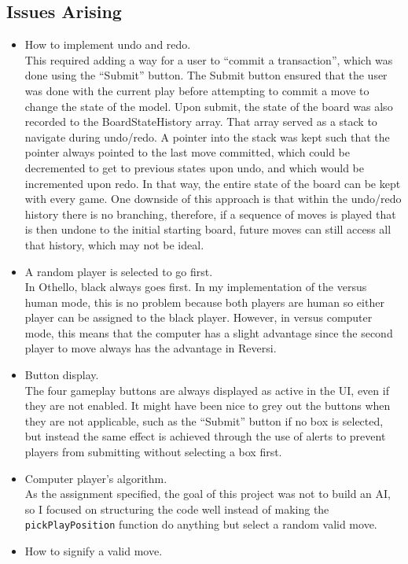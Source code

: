 \documentclass[11pt,letterpaper]{article}
\begin{document}
\subsection{Issues Arising}
\begin{itemize}
\item How to implement undo and redo.\\
This required adding a way for a user to ``commit a transaction'', which was done using the ``Submit'' button. The Submit button ensured that the user was done with the current play before attempting to commit a move to change the state of the model. Upon submit, the state of the board was also recorded to the BoardStateHistory array. That array served as a stack to navigate during undo/redo. A pointer into the stack was kept such that the pointer always pointed to the last move committed, which could be decremented to get to previous states upon undo, and which would be incremented upon redo. In that way, the entire state of the board can be kept with every game. One downside of this approach is that within the undo/redo history there is no branching, therefore, if a sequence of moves is played that is then undone to the initial starting board, future moves can still access all that history, which may not be ideal.
\item A random player is selected to go first.\\
In Othello, black always goes first. In my implementation of the versus human mode, this is no problem because both players are human so either player can be assigned to the black player. However, in versus computer mode, this means that the computer has a slight advantage since the second player to move always has the advantage in Reversi.
\item Button display.\\
The four gameplay buttons are always displayed as active in the UI, even if they are not enabled. It might have been nice to grey out the buttons when they are not applicable, such as the ``Submit'' button if no box is selected, but instead the same effect is achieved through the use of alerts to prevent players from submitting without selecting a box first.
\item Computer player's algorithm.\\
As the assignment specified, the goal of this project was not to build an AI, so I focused on structuring the code well instead of making the \texttt{pickPlayPosition} function do anything but select a random valid move.
\item  How to signify a valid move.\\

\end{itemize}
\end{document}
